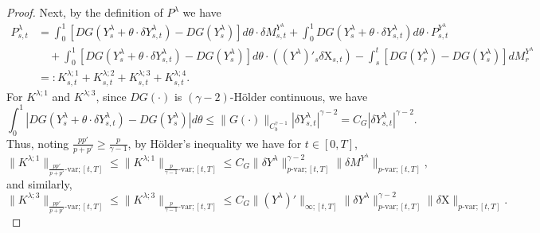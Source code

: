 \documentclass[10pt,a4paper]{amsart}
\begin{document}
\begin{proof}
Next, by the definition of $P^{\lambda}$ we have 
\begin{align}\nonumber
P^{\lambda}_{s,t} &= \int_{0}^{1}\left[D G(Y^{\lambda}_{s} + \theta\cdot \delta Y^{\lambda}_{s,t}) - D G(Y^{\lambda}_{s})\right]d\theta \cdot \delta M^{Y^{\lambda}}_{s,t} + \int_{0}^{1}D G(Y^{\lambda}_s + \theta \cdot \delta Y^{\lambda}_{s,t} )d\theta \cdot  P^{Y^{\lambda}}_{s,t}\\ \nonumber
&\quad + \int_{0}^{1} \left[D G(Y^{\lambda}_{s} + \theta \cdot \delta Y^{\lambda}_{s,t} ) - D G(Y^{\lambda}_{s})\right] d\theta \cdot ((Y^{\lambda})'_{s} \delta\mathrm X_{s,t}) - \int_{s}^{t} \left[D G(Y^{\lambda}_{r}) - D G(Y^{\lambda}_{s})\right]dM^{Y^{\lambda}}_{r}\\ \label{e:R^lambda}
&=: K^{\lambda;1}_{s,t} + K^{\lambda;2}_{s,t} + K^{\lambda;3}_{s,t} + K^{\lambda;4}_{s,t}.
\end{align}
For $K^{\lambda;1}$ and $K^{\lambda;3}$, since $DG(\bm\cdot)$ is $(\gamma - 2)$-H\"older continuous, we have
\begin{equation*}
\int_{0}^{1}|DG(Y^{\lambda}_{s} + \theta\cdot \delta Y^{\lambda}_{s,t}) - DG(Y^{\lambda}_{s})| d\theta \le \|G(\bm\cdot)\|_{C^{\gamma-1}_b} |\delta Y^{\lambda}_{s,t}|^{\gamma - 2} = C_G |\delta Y^{\lambda}_{s,t}|^{\gamma - 2}.
\end{equation*}
Thus, noting $\frac{pp'}{p+p'} \ge \frac{p}{\gamma - 1}$, by H\"older's inequality we have for $t\in [0,T]$, 
\begin{equation}\label{e:K lambda 1}
\|K^{\lambda;1}\|_{\frac{pp'}{p+p'}\text{-}\mathrm{var};[t,T]} \le \|K^{\lambda;1}\|_{\frac{p}{\gamma - 1}\text{-}\mathrm{var};[t,T]} \le C_{G} \|\delta Y^{\lambda}\|^{\gamma - 2}_{p\text{-}\mathrm{var};[t,T]} \|\delta M^{Y^{\lambda}}\|_{p\text{-}\mathrm{var};[t,T]},
\end{equation}
and similarly, 
\begin{equation}\label{e:K lambda 3}
\|K^{\lambda;3}\|_{\frac{pp'}{p+p'}\text{-}\mathrm{var};[t,T]} \le \|K^{\lambda;3}\|_{\frac{p}{\gamma - 1}\text{-}\mathrm{var};[t,T]}\le C_{G} \|(Y^{\lambda})'\|_{\infty;[t,T]} \|\delta Y^{\lambda}\|^{\gamma - 2}_{p\text{-}\mathrm{var};[t,T]} \|\delta \mathrm X\|_{p\text{-}\mathrm{var};[t,T]}.
\end{equation} 


\end{proof}
\end{document}
